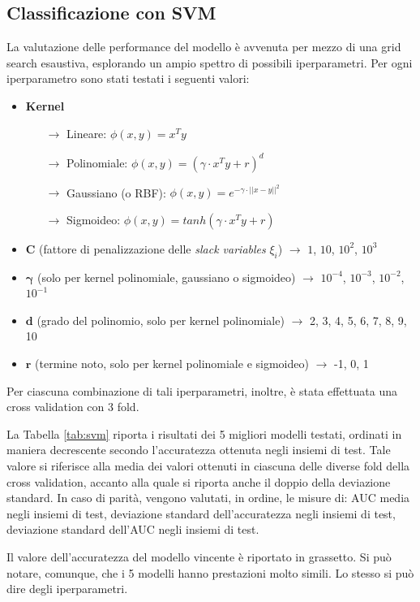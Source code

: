 \documentclass[a4paper]{article}
\begin{document}
\subsection{Classificazione con SVM}
La valutazione delle performance del modello è avvenuta per mezzo di una grid search esaustiva, esplorando un ampio spettro di possibili iperparametri. Per ogni iperparametro sono stati testati i seguenti valori:
\begin{itemize}
\item \textbf{Kernel}
	\begin{itemize}
	\item[$\rightarrow$] Lineare: $\phi(x, y) = x^Ty$
	\item[$\rightarrow$] Polinomiale: $\phi(x, y) = (\gamma \cdot x^Ty + r)^d$
	\item[$\rightarrow$] Gaussiano (o RBF): $\phi(x, y) = e^{-\gamma \cdot||x-y||^2}$
	\item[$\rightarrow$] Sigmoideo: $\phi(x, y) = tanh(\gamma \cdot x^Ty + r)$
	\end{itemize}
\item \textbf{C} (fattore di penalizzazione delle \emph{slack variables} $\xi_i$) $\rightarrow$ $1$, $10$, $10^2$, $10^3$
\item $\pmb{\gamma}$ (solo per kernel polinomiale, gaussiano o sigmoideo) $\rightarrow$ $10^{-4}$, $10^{-3}$, $10^{-2}$, $10^{-1}$
\item $\mathbf{d}$ (grado del polinomio, solo per kernel polinomiale) $\rightarrow$ 2, 3, 4, 5, 6, 7, 8, 9, 10
\item $\mathbf{r}$ (termine noto, solo per kernel polinomiale e sigmoideo) $\rightarrow$ -1, 0, 1
\end{itemize}
\noindent
Per ciascuna combinazione di tali iperparametri, inoltre, è stata effettuata una cross validation con 3 fold.

La Tabella \ref{tab:svm} riporta i risultati dei 5 migliori modelli testati, ordinati in maniera decrescente secondo l'accuratezza ottenuta negli insiemi di test. Tale valore si riferisce alla media dei valori ottenuti in ciascuna delle diverse fold della cross validation, accanto alla quale si riporta anche il doppio della deviazione standard. In caso di parità, vengono valutati, in ordine, le misure di: AUC media negli insiemi di test, deviazione standard dell'accuratezza negli insiemi di test, deviazione standard dell'AUC negli insiemi di test.

Il valore dell'accuratezza del modello vincente è riportato in grassetto. Si può notare, comunque, che i 5 modelli hanno prestazioni molto simili. Lo stesso si può dire degli iperparametri.
\end{document}
